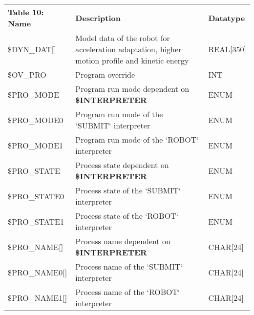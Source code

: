 \begin{appendices}
        \newpage
        \begin{tabular}{|p{}|p{}|p{}|}
        \hline
        \textbf{Table 10: Name} & \textbf{Description} & \textbf{Datatype} \\ \hline
        \$DYN\_DAT[] & Model data of the robot for acceleration adaptation, higher motion profile and kinetic energy & REAL[350] \\ \hline
        \$OV\_PRO & Program override & INT \\ \hline
        \$PRO\_MODE & Program run mode dependent on \textbf{\$INTERPRETER} & ENUM \\ \hline
        \$PRO\_MODE0 & Program run mode of the `SUBMIT` interpreter & ENUM \\ \hline
        \$PRO\_MODE1 & Program run mode of the `ROBOT` interpreter & ENUM \\ \hline
        \$PRO\_STATE & Process state dependent on \textbf{\$INTERPRETER} & ENUM \\ \hline
        \$PRO\_STATE0 & Process state of the `SUBMIT` interpreter & ENUM \\ \hline
        \$PRO\_STATE1 & Process state of the `ROBOT` interpreter & ENUM \\ \hline
        \$PRO\_NAME[] & Process name dependent on \textbf{\$INTERPRETER} & CHAR[24] \\ \hline
        \$PRO\_NAME0[] & Process name of the `SUBMIT` interpreter & CHAR[24] \\ \hline
        \$PRO\_NAME1[] & Process name of the `ROBOT` interpreter & CHAR[24] \\ \hline
        \end{tabular}
    \end{appendices}
